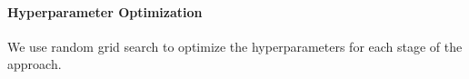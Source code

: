 \paragraph{Hyperparameter Optimization}
We use random grid search \cite{Bergstra:2012ux} to optimize the hyperparameters for each stage of the approach.

%

